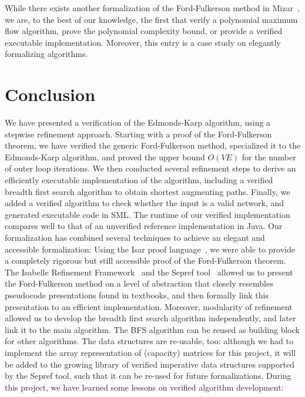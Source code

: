 \documentclass[11pt,a4paper]{article}
\begin{document}
While there exists another formalization of the Ford-Fulkerson method in
Mizar~\cite{Lee05}, we are, to the best of our knowledge, the first that verify a
polynomial maximum flow algorithm, prove the polynomial complexity bound, or
provide a verified executable implementation. Moreover, this entry is a case
study on elegantly formalizing algorithms.


\section{Conclusion}\label{sec:concl}
  We have presented a verification of the Edmonds-Karp algorithm, using a
  stepwise refinement approach. Starting with a proof of the Ford-Fulkerson
  theorem, we have verified the generic Ford-Fulkerson method, specialized it to
  the Edmonds-Karp algorithm, and proved the upper bound $O(VE)$ for the number
  of outer loop iterations. We then conducted several refinement steps to derive
  an efficiently executable implementation of the algorithm, including a
  verified breadth first search algorithm to obtain shortest augmenting paths.
  Finally, we added a verified algorithm to check whether the input is a valid
  network, and generated executable code in SML. The runtime of our verified
  implementation compares well to that of an unverified reference implementation
  in Java. Our formalization has combined several techniques to achieve an
  elegant and accessible formalization: Using the Isar proof
  language~\cite{Wenzel99}, we were able to provide a completely rigorous but
  still accessible proof of the Ford-Fulkerson theorem. The Isabelle Refinement
  Framework~\cite{LaTu12,La12} and the Sepref tool~\cite{La15,La16} allowed us
  to present the Ford-Fulkerson method on a level of abstraction that closely
  resembles pseudocode presentations found in textbooks, and then formally link
  this presentation to an efficient implementation. Moreover, modularity of
  refinement allowed us to develop the breadth first search algorithm
  independently, and later link it to the main algorithm. The BFS algorithm can
  be reused as building block for other algorithms. The data structures are
  re-usable, too: although we had to implement the array representation of
  (capacity) matrices for this project, it will be added to the growing library
  of verified imperative data structures supported by the Sepref tool, such that
  it can be re-used for future formalizations. During this project, we have
  learned some lessons on verified algorithm development: 
\end{document}
